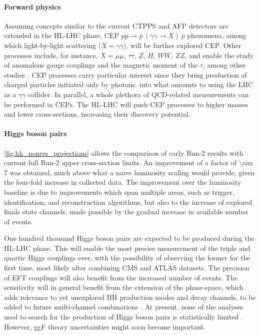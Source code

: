 \documentclass[11pt]{article}
\newcommand{\run}[1]{Run-#1}
\begin{document}
\paragraph{Forward physics}

Assuming concepts similar to the current \ac{CTPPS} \cite{ctpps_tdr} and \ac{AFP} \cite{afp_tdr} detectors are extended in the \ac{HL-LHC} phase, \ac{CEP} \(pp \rightarrow p\,(\gamma\gamma\rightarrow X)\,p\) phenomena, among which light-by-light scattering (\(X = \gamma\gamma\)), will be further explored \ac{CEP}.
Other processes include, for instance, \(X = \mu\mu,\,\tau\tau,\,Z,\,H,\,WW,\,ZZ\), and enable the study of anomalous gauge couplings and the magnetic moment of the \(\tau\), among other studies \cite{ctpps_varela,ctpps_pitt}.
\ac{CEP} processes carry particular interest since they bring production of charged particles initiated only by photons, into what amounts to using the \ac{LHC} as a \(\gamma\gamma\) collider.
In parallel, a whole plethora of \ac{QCD}-related measurements can be performed in \acp{CEP}.
The \ac{HL-LHC} will push \ac{CEP} processes to higher masses and lower cross-sections, increasing their discovery potential.


\paragraph{Higgs boson pairs}

\cref{fig:hh_nonres_projections} allows the comparison of early \run{2} results with current full \run{2} upper cross-section limits.
An improvement of a factor of \num{\sim 7} was obtained, much above what a naive luminosity scaling would provide, given the four-fold increase in collected data.
The improvement over the luminosity baseline is due to improvements which span multiple areas, such as trigger, identification, and reconstruction algorithms, but also to the increase of explored finals state channels, made possible by the gradual increase in available number of events.

One hundred thousand Higgs boson pairs are expected to be produced during the \ac{HL-LHC} phase.
This will enable the most precise measurement of the triple and quartic Higgs couplings ever, with the possibility of observing the former for the first time, most likely after combining \ac{CMS} and \ac{ATLAS} datasets.
The precision of \ac{EFT} couplings will also benefit from the increased number of events.
The sensitivity will in general benefit from the extension of the phase-space, which adds relevance to yet unexplored HH production modes and decay channels, to be added to future multi-channel combinations \cite{higgs_10_years}.
At present, none of the analyses used to search for the production of Higgs boson pairs is statistically limited \cite{andre_david_higgs_ten_years}.
However, \ac{ggF} theory uncertainties might soon become important.
\end{document}

